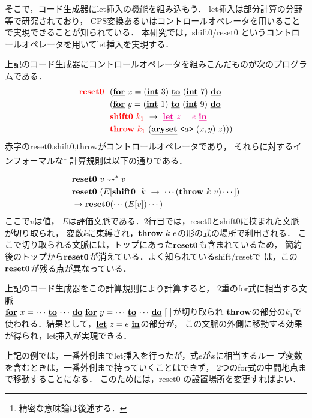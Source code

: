 そこで，コード生成器にlet挿入の機能を組み込もう．
let挿入は部分計算の分野等で研究されており，
CPS変換あるいはコントロールオペレータを用いることで実現できることが知られている．
本研究では，shift0/reset0 というコントロールオペレータを用いてlet挿入を実現する．

上記のコード生成器にコントロールオペレータを組みこんだものが次のプログラムである．
\begin{align*}
  &\red{\Resetz} ~~(\cforin{x=(\cint~3)}{(\cint~7)} \\
  &\phantom{\Resetz} ~~(\cforin{y=(\cint~1)}{(\cint~9)} \\
  &\phantom{\Resetz} ~~\red{\Shiftz}~\red{k_1}~\to~ \magenta{\cLet~z=e~\cIn} \\
  &\phantom{\Resetz} ~~\red{\Throw}~\red{k_1}~(\caryset{\code{a}}{(x,y)}{z})))
\end{align*}
赤字のreset0,shift0,throwがコントロールオペレータであり，
それらに対するインフォーマルな\footnote{精密な意味論は後述する．}%
計算規則は以下の通りである．

\begin{align*}
  & \textbf{reset0} ~v \leadsto^* v \\
  & \textbf{reset0} ~(E[\textbf{shift0}~~k~\to~\cdots(\textbf{throw}~k~v)\cdots]) \\
  & \to \textbf{reset0}(\cdots (E[v]) \cdots)
\end{align*}
ここで$v$は値，
$E$は評価文脈である．2行目では，reset0とshift0に挟まれた文脈が切り取られ，
変数$k$に束縛され，$\textbf{throw}~k~e$の形の式の場所で利用される．
ここで切り取られる文脈には，トップにあった$\textbf{reset0}$も含まれているため，
簡約後のトップから$\textbf{reset0}$が消えている．よく知られているshift/resetで
は，この$\textbf{reset0}$が残る点が異なっている．

上記のコード生成器をこの計算規則により計算すると，
2重のfor式に相当する文脈\\
$\underline{\textbf{for}}~{x=\cdots}~\underline{\textbf{to}}~{\cdots}~\underline{\textbf{do}}~\underline{\textbf{for}}~{y=\cdots}~\underline{\textbf{to}}~{\cdots}~\underline{\textbf{do}}~[~]$が切り取られ
$\textbf{throw}$の部分の$k_1$で使われる．結果として，$\underline{\textbf{let}}~z=e~\underline{\textbf{in}}$の部分が，
この文脈の外側に移動する効果が得られ，let挿入が実現できる．

上記の例では，一番外側までlet挿入を行ったが，式$e$が$x$に相当するルー
プ変数を含むときは，一番外側まで持っていくことはできず，
2つのfor式の中間地点まで移動することになる．
このためには，reset0 の設置場所を変更すればよい．

